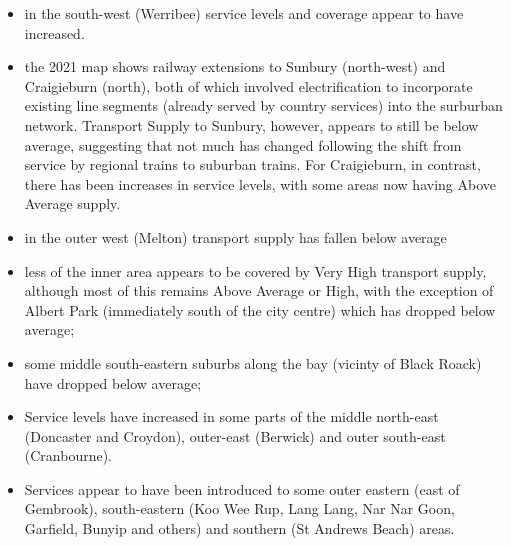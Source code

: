 \documentclass[preprint, 3p,
authoryear]{elsarticle} %
\providecommand{\tightlist}{%
  \setlength{\itemsep}{0pt}\setlength{\parskip}{0pt}}
\begin{document}
\begin{itemize}
\tightlist
\item
  in the south-west (Werribee) service levels and coverage appear to
  have increased.
\item
  the 2021 map shows railway extensions to Sunbury (north-west) and
  Craigieburn (north), both of which involved electrification to
  incorporate existing line segments (already served by country
  services) into the surburban network. Transport Supply to Sunbury,
  however, appears to still be below average, suggesting that not much
  has changed following the shift from service by regional trains to
  suburban trains. For Craigieburn, in contrast, there has been
  increases in service levels, with some areas now having Above Average
  supply.
\item
  in the outer west (Melton) transport supply has fallen below average
\item
  less of the inner area appears to be covered by Very High transport
  supply, although most of this remains Above Average or High, with the
  exception of Albert Park (immediately south of the city centre) which
  has dropped below average;
\item
  some middle south-eastern suburbs along the bay (vicinty of Black
  Roack) have dropped below average;
\item
  Service levels have increased in some parts of the middle north-east
  (Doncaster and Croydon), outer-east (Berwick) and outer south-east
  (Cranbourne).
\item
  Services appear to have been introduced to some outer eastern (east of
  Gembrook), south-eastern (Koo Wee Rup, Lang Lang, Nar Nar Goon,
  Garfield, Bunyip and others) and southern (St Andrews Beach) areas.
\end{itemize}
\end{document}

